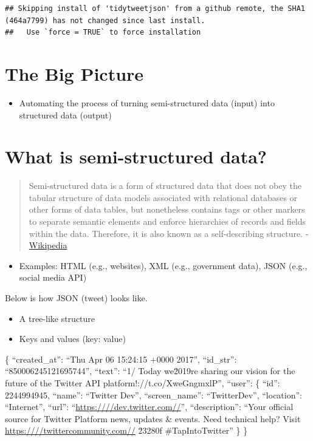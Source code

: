 \documentclass[
]{book}
\providecommand{\tightlist}{%
  \setlength{\itemsep}{0pt}\setlength{\parskip}{0pt}}
\begin{document}
\begin{verbatim}
## Skipping install of 'tidytweetjson' from a github remote, the SHA1 (464a7799) has not changed since last install.
##   Use `force = TRUE` to force installation
\end{verbatim}

\section{The Big Picture}\label{the-big-picture-8}

\begin{itemize}
\tightlist
\item
  Automating the process of turning semi-structured data (input) into structured data (output)
\end{itemize}

\section{What is semi-structured data?}\label{what-is-semi-structured-data}

\begin{quote}
Semi-structured data is a form of structured data that does not obey the tabular structure of data models associated with relational databases or other forms of data tables, but nonetheless contains tags or other markers to separate semantic elements and enforce hierarchies of records and fields within the data. Therefore, it is also known as a self-describing structure. - \href{https://en.wikipedia.org/wiki/Semi-structured_data\#:~:text=Semi\%2Dstructured\%20data\%20is\%20a,and\%20fields\%20within\%20the\%20data.}{Wikipedia}
\end{quote}

\begin{itemize}
\tightlist
\item
  Examples: HTML (e.g., websites), XML (e.g., government data), JSON (e.g., social media API)
\end{itemize}

Below is how JSON (tweet) looks like.

\begin{itemize}
\item
  A tree-like structure
\item
  Keys and values (key: value)
\end{itemize}

\{
``created\_at'': ``Thu Apr 06 15:24:15 +0000 2017'',
``id\_str'': ``850006245121695744'',
``text'': ``1/ Today we\u2019re sharing our vision for the future of the Twitter API platform!\nhttps://t.co/XweGngmxlP'',
``user'': \{
``id'': 2244994945,
``name'': ``Twitter Dev'',
``screen\_name'': ``TwitterDev'',
``location'': ``Internet'',
``url'': ``\url{https:////dev.twitter.com//}'',
``description'': ``Your official source for Twitter Platform news, updates \& events. Need technical help? Visit \url{https:////twittercommunity.com//} \u2328\ufe0f \#TapIntoTwitter''
\}
\}
\end{document}
